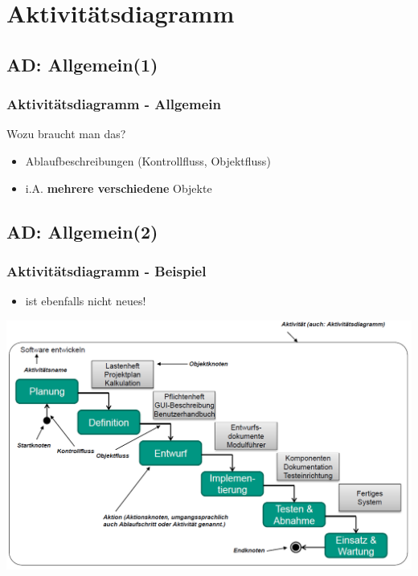 \documentclass[18pt]{beamer}
\begin{document}
\section{Aktivitätsdiagramm}
	\subsection{AD: Allgemein(1)}
	\begin{frame}
		\frametitle{Aktivitätsdiagramm - Allgemein}
		\begin{block}{Wozu braucht man das?}
			\pause
			\begin{itemize}
				\item Ablaufbeschreibungen (Kontrollfluss, Objektfluss)
				\item i.A. \textbf{mehrere verschiedene} Objekte
			\end{itemize}
		\end{block}
	\end{frame}

	\subsection{AD: Allgemein(2)}
	\begin{frame}
		\frametitle{Aktivitätsdiagramm - Beispiel}
		\begin{itemize}
			\item ist ebenfalls nicht neues!
		\end{itemize}
		\centering
		\includegraphics[scale=0.35]{./pics/tut2/act_wat.png}
	\end{frame}
\end{document}
